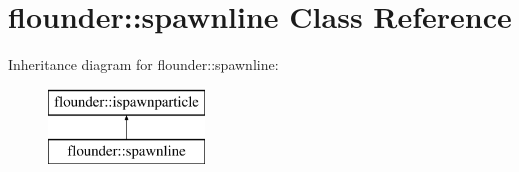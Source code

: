 \hypertarget{classflounder_1_1spawnline}{}\section{flounder\+:\+:spawnline Class Reference}
\label{classflounder_1_1spawnline}
Inheritance diagram for flounder\+:\+:spawnline\+:\begin{figure}[H]
\begin{center}
\leavevmode
\includegraphics[height=2.000000cm]{classflounder_1_1spawnline}
\end{center}
\end{figure}
